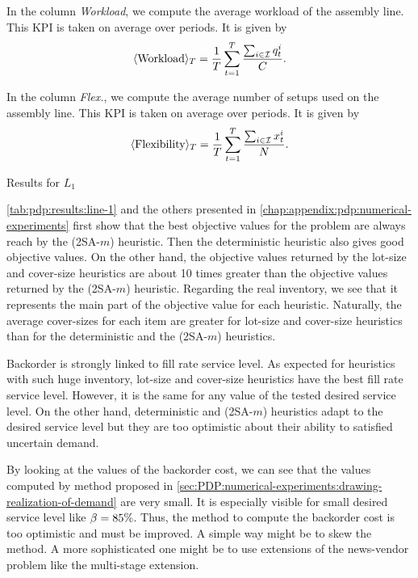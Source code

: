 In the column \emph{Workload}, we compute the average workload of the assembly line.
This KPI is taken on average over periods.
It is given by
\begin{equation}
  \left<\mbox{Workload}\right>_{\horizon} = \frac{1}{\horizon} \sum_{t=1}^{\horizon} \frac{\sum_{i\in\REF} \quantity_t^i}{\capacity}.
\end{equation}


In the column \emph{Flex.}, we compute the average number of setups used on the assembly line.
This KPI is taken on average over periods.
It is given by
\begin{equation}
  \left<\mbox{Flexibility}\right>_{\horizon} = \frac{1}{\horizon} \sum_{t=1}^{\horizon} \frac{\sum_{i\in\REF} \setup_t^i}{\nbsetups}.
\end{equation}


\begin{table}[!ht]

\caption{Results for $L_1$}
\label{tab:pdp:results:line-1}
\end{table}


\cref{tab:pdp:results:line-1} and the others presented in \cref{chap:appendix:pdp:numerical-experiments} first show that the best objective values for the problem are always reach by the (2SA-$m$) heuristic.
Then the deterministic heuristic also gives good objective values.
On the other hand, the objective values returned by the lot-size and cover-size heuristics are about 10 times greater than the objective values returned by the (2SA-$m$) heuristic.
Regarding the real inventory, we see that it represents the main part of the objective value for each heuristic.
Naturally, the average cover-sizes for each item are greater for lot-size and cover-size heuristics than for the deterministic and the (2SA-$m$) heuristics.


Backorder is strongly linked to fill rate service level.
As expected for heuristics with such huge inventory, lot-size and cover-size heuristics have the best fill rate service level.
However, it is the same for any value of the tested desired service level.
On the other hand, deterministic and (2SA-$m$) heuristics adapt to the desired service level but they are too optimistic about their ability to satisfied uncertain demand.


By looking at the values of the backorder cost, we can see that the values computed by method proposed in \cref{sec:PDP:numerical-experiments:drawing-realization-of-demand} are very small.
It is especially visible for small desired service level like $\beta=85\%$.
Thus, the method to compute the backorder cost is too optimistic and must be improved.
A simple way might be to skew the method.
A more sophisticated one might be to use extensions of the news-vendor problem like the multi-stage extension.


